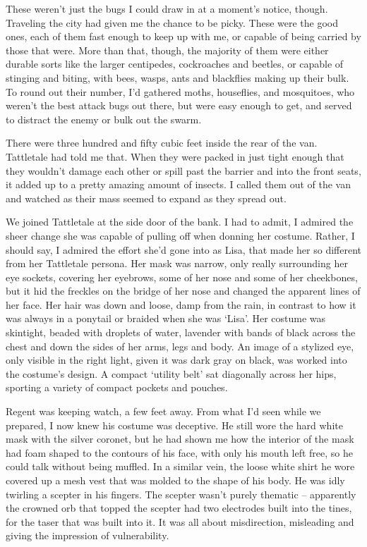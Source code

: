 These weren't just the bugs I could draw in at a moment's notice, though.  Traveling the city had given me the chance to be picky.  These were the good ones, each of them fast enough to keep up with me, or capable of being carried by those that were.  More than that, though, the majority of them were either durable sorts like the larger centipedes, cockroaches and beetles, or capable of stinging and biting, with bees, wasps, ants and blackflies making up their bulk.  To round out their number, I'd gathered moths, houseflies, and mosquitoes, who weren't the best attack bugs out there, but were easy enough to get, and served to distract the enemy or bulk out the swarm.



There were three hundred and fifty cubic feet inside the rear of the van. Tattletale had told me that.  When they were packed in just tight enough that they wouldn't damage each other or spill past the barrier and into the front seats, it added up to a pretty amazing amount of insects.  I called them out of the van and watched as their mass seemed to expand as they spread out.



We joined Tattletale at the side door of the bank. I had to admit, I admired the sheer change she was capable of pulling off when donning her costume.  Rather, I should say, I admired the effort she'd gone into as Lisa, that made her so different from her Tattletale persona.  Her mask was narrow, only really surrounding her eye sockets, covering her eyebrows, some of her nose and some of her cheekbones, but it hid the freckles on the bridge of her nose and changed the apparent lines of her face.  Her hair was down and loose, damp from the rain, in contrast to how it was always in a ponytail or braided when she was `Lisa'.  Her costume was skintight, beaded with droplets of water, lavender with bands of black across the chest and down the sides of her arms, legs and body.  An image of a stylized eye, only visible in the right light, given it was dark gray on black, was worked into the costume's design.  A compact `utility belt' sat diagonally across her hips, sporting a variety of compact pockets and pouches.



Regent was keeping watch, a few feet away.  From what I'd seen while we prepared, I now knew his costume was deceptive.  He still wore the hard white mask with the silver coronet, but he had shown me how the interior of the mask had foam shaped to the contours of his face, with only his mouth left free, so he could talk without being muffled.  In a similar vein, the loose white shirt he wore covered up a mesh vest that was molded to the shape of his body.  He was idly twirling a scepter in his fingers.  The scepter wasn't purely thematic – apparently the crowned orb that topped the scepter had two electrodes built into the tines, for the taser that was built into it.  It was all about misdirection, misleading and giving the impression of vulnerability.



